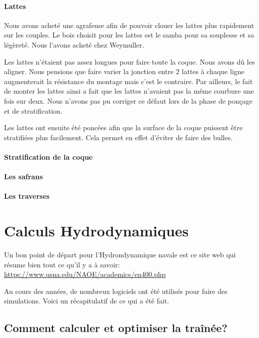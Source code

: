 \documentclass[a4paper, 11pt]{report}
\begin{document}
\subsection{Lattes}
Nous avons acheté une agrafeuse afin de pouvoir clouer les lattes plus rapidement sur les couples. Le bois choisit pour les lattes est le samba pour sa souplesse et sa légèreté. Nous l'avons acheté chez Weymuller.

Les lattes n'étaient pas assez longues pour faire toute la coque. Nous avons dû les aligner. Nous pensions que faire varier la jonction entre 2 lattes à chaque ligne augmenterait la résistance du montage mais c'est le contraire. Par ailleurs, le fait de monter les lattes ainsi a fait que les lattes n'avaient pas la même courbure une fois sur deux. Nous n'avons pas pu corriger ce défaut lors de la phase de ponçage et de stratification. 

Les lattes ont ensuite été poncées afin que la surface de la coque puissent être stratifiées plus facilement. Cela permet en effet d'éviter de faire des bulles.

\subsection{Stratification de la coque}

\subsection{Les safrans}

\subsection{Les traverses}

\part{Calculs Hydrodynamiques}
Un bon point de départ pour l'Hydrondynamique navale est ce site web qui résume bien tout ce qu'il y a à savoir: \url{https://www.usna.edu/NAOE/academics/en400.php}

Au cours des années, de nombreux logiciels ont été utilisés pour faire des simulations. Voici un récapitulatif de ce qui a été fait.

\chapter{Comment calculer et optimiser la traînée?}
\end{document}
